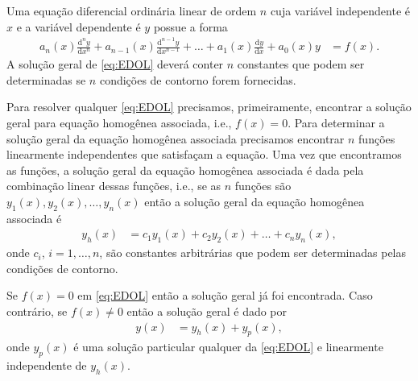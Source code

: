 \documentclass[a4paper,12pt, leqno, answers]{exam}
\begin{document}
\thispagestyle{empty}

\newpage
\setcounter{page}{1}
\nocite{Riley:2006:Mathematical}Uma equa\c{c}\~{a}o diferencial ordin\'{a}ria linear de ordem $n$ cuja vari\'{a}vel independente \'{e} $x$ e a vari\'{a}vel dependente \'{e} $y$ possue a forma
\begin{align*}
    a_n(x) \frac{\mathrm{d}^ny}{\mathrm{d}x^n} + a_{n - 1}(x) \frac{\mathrm{d}^{n - 1}y}{\mathrm{d}x^{n - 1}} + \ldots + a_1(x) \frac{\mathrm{d}y}{\mathrm{d}x} + a_0(x) y &= f(x). \tag{EDOL} \label{eq:EDOL}
\end{align*}
A solu\c{c}\~{a}o geral de \eqref{eq:EDOL} dever\'{a} conter $n$ constantes que podem ser determinadas se $n$ condi\c{c}\~{o}es de contorno forem fornecidas.

Para resolver qualquer \eqref{eq:EDOL} precisamos, primeiramente, encontrar a solu\c{c}\~{a}o geral para equa\c{c}\~{a}o homog\^{e}nea associada, i.e., $f(x) = 0$. Para determinar a solu\c{c}\~{a}o geral da equa\c{c}\~{a}o homog\^{e}nea associada precisamos encontrar $n$ fun\c{c}\~{o}es linearmente independentes que satisfa\c{c}am a equa\c{c}\~{a}o. Uma vez que encontramos as fun\c{c}\~{o}es, a solu\c{c}\~{a}o geral da equa\c{c}\~{a}o homog\^{e}nea associada \'{e} dada pela combina\c{c}\~{a}o linear dessas fun\c{c}\~{o}es, i.e., se as $n$ fun\c{c}\~{o}es s\~{a}o $y_1(x), y_2(x), \ldots, y_n(x)$ ent\~{a}o a solu\c{c}\~{a}o geral da equa\c{c}\~{a}o homog\^{e}nea associada \'{e}
\begin{align*}
    y_h(x) &= c_1 y_1(x) + c_2 y_2(x) + \ldots + c_n y_n(x),
\end{align*}
onde $c_i$, $i = 1, \ldots, n$, s\~{a}o constantes arbitr\'{a}rias que podem ser determinadas pelas condi\c{c}\~{o}es de contorno.

Se $f(x) = 0$ em \eqref{eq:EDOL} ent\~{a}o a solu\c{c}\~{a}o geral j\'{a} foi encontrada. Caso contr\'{a}rio, se $f(x) \neq 0$ ent\~{a}o a solu\c{c}\~{a}o geral \'{e} dado por
\begin{align*}
    y(x) &= y_h(x) + y_p(x),
\end{align*}
onde $y_p(x)$ \'{e} uma solu\c{c}\~{a}o particular qualquer da \eqref{eq:EDOL} e linearmente independente de $y_h(x)$.
\end{document}

